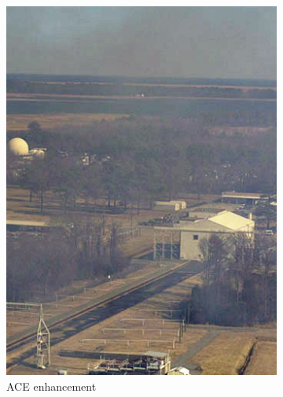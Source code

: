 \documentclass[12pt, a4paper, font = Times New Roman]{article}
\begin{document}
\begin{figure}[!h]
\begin{subfigure}[b]{0.3\textwidth}
    \includegraphics[width=\textwidth]{123.jpg}
    \caption{ACE enhancement}
    \label{fig:ace}
  \end{subfigure}
   \begin{subfigure}[b]{0.3\textwidth}

\end{subfigure}
\end{figure}
\end{document}
